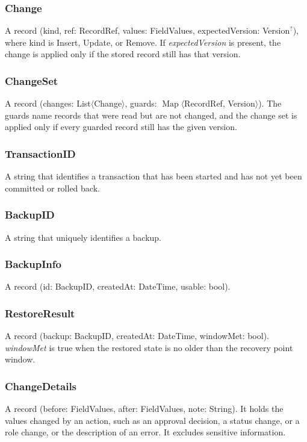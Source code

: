 \documentclass[12pt, titlepage]{article}
\begin{document}
\subsubsection{Change}
A record (kind, ref: RecordRef, values: FieldValues, expectedVersion: Version$^{?}$),
where kind is Insert, Update, or Remove. If \textit{expectedVersion} is present,
the change is applied only if the stored record still has that version.

\subsubsection{ChangeSet}
A record (changes: List$\langle$Change$\rangle$, guards: $\operatorname{Map}\langle$RecordRef, Version$\rangle$).
The guards name records that were read but are not changed, and the change set is applied only
if every guarded record still has the given version.

\subsubsection{TransactionID}
A string that identifies a transaction that has been started and has not yet been committed or rolled back.

\subsubsection{BackupID}
A string that uniquely identifies a backup.

\subsubsection{BackupInfo}
A record (id: BackupID, createdAt: DateTime, usable: bool).

\subsubsection{RestoreResult}
A record (backup: BackupID, createdAt: DateTime, windowMet: bool).
\textit{windowMet} is true when the restored state is no older than the recovery point window.

\subsubsection{ChangeDetails}
A record (before: FieldValues, after: FieldValues, note: String). It holds the values changed by an action,
such as an approval decision, a status change, or a role change, or the description of an error.
It excludes sensitive information.
\end{document}
